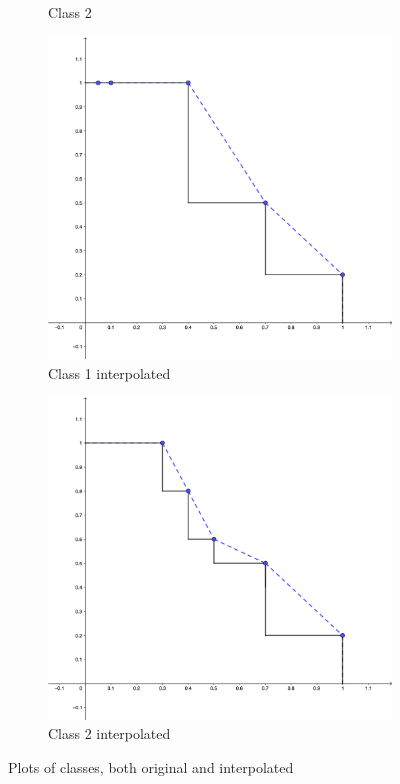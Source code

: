 \begin{figure}[h!]
\begin{subfigure}[b]{0.24\textwidth}
        \caption*{Class 2}
    \end{subfigure}
    \hfill
    \begin{subfigure}[b]{0.24\textwidth}
        \centering
        \includegraphics[width=\textwidth]{Images/task1c1_interpolated.png}
        \caption*{Class 1 interpolated}
    \end{subfigure}
    \hfill
    \begin{subfigure}[b]{0.24\textwidth}
        \centering
        \includegraphics[width=\textwidth]{Images/task1c2_interpolated.png}
        \caption*{Class 2 interpolated}
    \end{subfigure}
    \caption{Plots of classes, both original and interpolated}
\end{figure}

